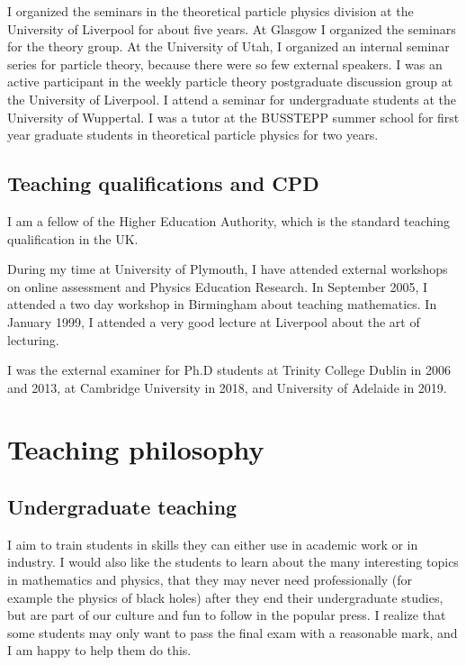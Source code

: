 \documentclass[12pt]{article}
\begin{document}
I organized the seminars in the theoretical particle physics division
at the University of Liverpool for about five years. At Glasgow I
organized the seminars for the theory group.  At the University of
Utah, I organized an internal seminar series for particle theory,
because there were so few external speakers.
I was an active
participant in the weekly particle theory postgraduate discussion
group at the University of Liverpool.
I attend a seminar for undergraduate students at the University
of Wuppertal.
I was a tutor at the BUSSTEPP summer school for first year
graduate students in theoretical particle physics for two years.



\subsection{Teaching qualifications and CPD}

I am a fellow of the Higher Education Authority, which is the standard  teaching
qualification in the UK.

During my time at University of Plymouth, I have attended external workshops on online
assessment and Physics Education Research.  In September 2005, I
attended a two day workshop in Birmingham about teaching
mathematics. In January 1999, I attended a very good lecture at
Liverpool about the art of lecturing.

I was the external examiner for Ph.D students
at Trinity College Dublin in 2006 and 2013,
at Cambridge University in 2018,
and University of Adelaide in 2019.   


\section{Teaching philosophy} 

\subsection{Undergraduate teaching}

I aim to train students in skills they
can either use in academic work or in
industry. I would also like the students to
learn about the many interesting 
topics in mathematics and physics, that they may never 
need professionally (for example the physics of black holes)
after they end their undergraduate
studies, but are part of our culture and fun
to follow in the popular press.
I realize that some students may only want
to pass the final exam with a reasonable mark,
and I am happy to help them do this.
\end{document}
